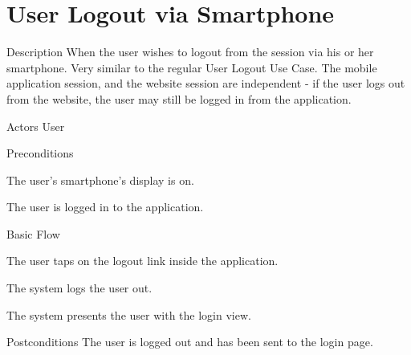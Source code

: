 \section{User Logout via Smartphone}

\begin{cpart}{Description}
When the user wishes to logout from the session via his or her smartphone. Very similar to the regular User Logout Use Case. The mobile application session, and the website session are independent - if the user logs out from the website, the user may still be logged in from the application.
\end{cpart}

\begin{cpart}{Actors}
User
\end{cpart}

\begin{cpartList}{Preconditions}
\item The user's smartphone's display is on.
\item The user is logged in to the application.
\end{cpartList}

\begin{cpartList}{Basic Flow}
\item The user taps on the logout link inside the application.
\item The system logs the user out.
\item The system presents the user with the login view.
\end{cpartList}

\begin{cpart}{Postconditions}
The user is logged out and has been sent to the login page.
\end{cpart}
